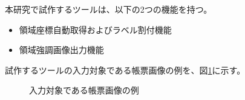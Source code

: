 本研究で試作するツールは、以下の2つの機能を持つ。

\begin{itemize}
    \item 領域座標自動取得およびラベル割付機能
    \item 領域強調画像出力機能
\end{itemize}

試作するツールの入力対象である帳票画像の例を、図\ref{fig:original}に示す。
\begin{figure}[tp]
    \begin{center}
        \caption{入力対象である帳票画像の例}
        \label{fig:original}
    \end{center}
\end{figure}

